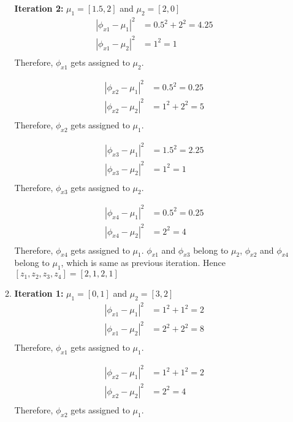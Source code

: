 \documentclass[12pt]{article}
\begin{document}
\begin{enumerate}[label=(\alph*)]
\begin{enumerate}[label=(\arabic*)]
	\textbf{Iteration 2:}
	$\mu_1 = [1.5,2]$ and $\mu_2 = [2,0]$ \\

	\begin{align*}
	|\phi_{x1} - \mu_1|^2 &= 0.5^2 + 2^2 = 4.25 \\
	|\phi_{x1} - \mu_2|^2 &= 1^2 = 1 \\
	\end{align*}
	Therefore, $\phi_{x1}$ gets assigned to $\mu_2$.
	
	\begin{align*}
	|\phi_{x2} - \mu_1|^2 &= 0.5^2 = 0.25 \\
	|\phi_{x2} - \mu_2|^2 &= 1^2 + 2^2 = 5 \\
	\end{align*}
	Therefore, $\phi_{x2}$ gets assigned to $\mu_1$.
	
	\begin{align*}
	|\phi_{x3} - \mu_1|^2 &= 1.5^2 = 2.25 \\
	|\phi_{x3} - \mu_2|^2 &= 1^2 = 1 \\
	\end{align*}
	Therefore, $\phi_{x3}$ gets assigned to $\mu_2$.
	
	\begin{align*}
	|\phi_{x4} - \mu_1|^2 &= 0.5^2 = 0.25 \\
	|\phi_{x4} - \mu_2|^2 &= 2^2 = 4 \\
	\end{align*}
	Therefore, $\phi_{x4}$ gets assigned to $\mu_1$.
	$\phi_{x1}$ and $\phi_{x3}$ belong to $\mu_2$, $\phi_{x2}$ and $\phi_{x4}$ belong to $\mu_1$, which is same as previous iteration. Hence $[z_1, z_2, z_3, z_4] = [2,1,2,1] $\\
	\item
	\textbf{Iteration 1:}
	$\mu_1 = [0,1]$ and $\mu_2 = [3,2]$ \\
	\begin{align*}
	|\phi_{x1} - \mu_1|^2 &= 1^2 + 1^2 = 2 \\
	|\phi_{x1} - \mu_2|^2 &= 2^2 + 2^2 = 8 \\
	\end{align*}
	Therefore, $\phi_{x1}$ gets assigned to $\mu_1$.
	
	\begin{align*}
	|\phi_{x2} - \mu_1|^2 &= 1^2 + 1^2 = 2 \\
	|\phi_{x2} - \mu_2|^2 &= 2^2 = 4 \\
	\end{align*}
	Therefore, $\phi_{x2}$ gets assigned to $\mu_1$.
	

\end{enumerate}
\end{enumerate}
\end{document}
